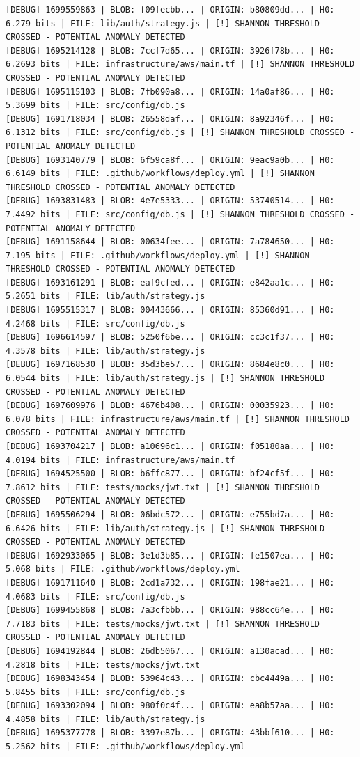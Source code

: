 \documentclass[12pt, a4paper, oneside]{report}
\begin{document}
\begin{lstlisting}[basicstyle=\tiny\ttfamily]
[DEBUG] 1699559863 | BLOB: f09fecbb... | ORIGIN: b80809dd... | H0: 6.279 bits | FILE: lib/auth/strategy.js | [!] SHANNON THRESHOLD CROSSED - POTENTIAL ANOMALY DETECTED
[DEBUG] 1695214128 | BLOB: 7ccf7d65... | ORIGIN: 3926f78b... | H0: 6.2693 bits | FILE: infrastructure/aws/main.tf | [!] SHANNON THRESHOLD CROSSED - POTENTIAL ANOMALY DETECTED
[DEBUG] 1695115103 | BLOB: 7fb090a8... | ORIGIN: 14a0af86... | H0: 5.3699 bits | FILE: src/config/db.js
[DEBUG] 1691718034 | BLOB: 26558daf... | ORIGIN: 8a92346f... | H0: 6.1312 bits | FILE: src/config/db.js | [!] SHANNON THRESHOLD CROSSED - POTENTIAL ANOMALY DETECTED
[DEBUG] 1693140779 | BLOB: 6f59ca8f... | ORIGIN: 9eac9a0b... | H0: 6.6149 bits | FILE: .github/workflows/deploy.yml | [!] SHANNON THRESHOLD CROSSED - POTENTIAL ANOMALY DETECTED
[DEBUG] 1693831483 | BLOB: 4e7e5333... | ORIGIN: 53740514... | H0: 7.4492 bits | FILE: src/config/db.js | [!] SHANNON THRESHOLD CROSSED - POTENTIAL ANOMALY DETECTED
[DEBUG] 1691158644 | BLOB: 00634fee... | ORIGIN: 7a784650... | H0: 7.195 bits | FILE: .github/workflows/deploy.yml | [!] SHANNON THRESHOLD CROSSED - POTENTIAL ANOMALY DETECTED
[DEBUG] 1693161291 | BLOB: eaf9cfed... | ORIGIN: e842aa1c... | H0: 5.2651 bits | FILE: lib/auth/strategy.js
[DEBUG] 1695515317 | BLOB: 00443666... | ORIGIN: 85360d91... | H0: 4.2468 bits | FILE: src/config/db.js
[DEBUG] 1696614597 | BLOB: 5250f6be... | ORIGIN: cc3c1f37... | H0: 4.3578 bits | FILE: lib/auth/strategy.js
[DEBUG] 1697168530 | BLOB: 35d3be57... | ORIGIN: 8684e8c0... | H0: 6.0544 bits | FILE: lib/auth/strategy.js | [!] SHANNON THRESHOLD CROSSED - POTENTIAL ANOMALY DETECTED
[DEBUG] 1697609976 | BLOB: 4676b408... | ORIGIN: 00035923... | H0: 6.078 bits | FILE: infrastructure/aws/main.tf | [!] SHANNON THRESHOLD CROSSED - POTENTIAL ANOMALY DETECTED
[DEBUG] 1693704217 | BLOB: a10696c1... | ORIGIN: f05180aa... | H0: 4.0194 bits | FILE: infrastructure/aws/main.tf
[DEBUG] 1694525500 | BLOB: b6ffc877... | ORIGIN: bf24cf5f... | H0: 7.8612 bits | FILE: tests/mocks/jwt.txt | [!] SHANNON THRESHOLD CROSSED - POTENTIAL ANOMALY DETECTED
[DEBUG] 1695506294 | BLOB: 06bdc572... | ORIGIN: e755bd7a... | H0: 6.6426 bits | FILE: lib/auth/strategy.js | [!] SHANNON THRESHOLD CROSSED - POTENTIAL ANOMALY DETECTED
[DEBUG] 1692933065 | BLOB: 3e1d3b85... | ORIGIN: fe1507ea... | H0: 5.068 bits | FILE: .github/workflows/deploy.yml
[DEBUG] 1691711640 | BLOB: 2cd1a732... | ORIGIN: 198fae21... | H0: 4.0683 bits | FILE: src/config/db.js
[DEBUG] 1699455868 | BLOB: 7a3cfbbb... | ORIGIN: 988cc64e... | H0: 7.7183 bits | FILE: tests/mocks/jwt.txt | [!] SHANNON THRESHOLD CROSSED - POTENTIAL ANOMALY DETECTED
[DEBUG] 1694192844 | BLOB: 26db5067... | ORIGIN: a130acad... | H0: 4.2818 bits | FILE: tests/mocks/jwt.txt
[DEBUG] 1698343454 | BLOB: 53964c43... | ORIGIN: cbc4449a... | H0: 5.8455 bits | FILE: src/config/db.js
[DEBUG] 1693302094 | BLOB: 980f0c4f... | ORIGIN: ea8b57aa... | H0: 4.4858 bits | FILE: lib/auth/strategy.js
[DEBUG] 1695377778 | BLOB: 3397e87b... | ORIGIN: 43bbf610... | H0: 5.2562 bits | FILE: .github/workflows/deploy.yml
\end{lstlisting}
\end{document}

